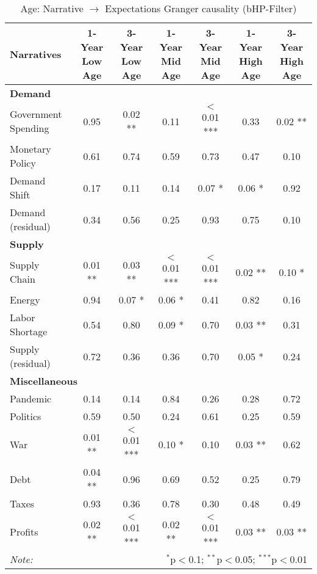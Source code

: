 \begin{sidewaystable}[H]
\centering
\footnotesize
\caption{Age: Narrative $\rightarrow$ Expectations Granger causality (bHP-Filter)}\label{table:granger}

\begin{tabular}{lcccccc}
\toprule
\textbf{Narratives} & \textbf{1-Year Low Age} & \textbf{3-Year Low Age} & \textbf{1-Year Mid Age} & \textbf{3-Year Mid Age} & \textbf{1-Year High Age} & \textbf{3-Year High Age} \\
\midrule
\multicolumn{7}{l}{\textbf{Demand}} \\
\midrule
Government Spending & 0.95 & 0.02 ** & 0.11 & $<$0.01 *** & 0.33 & 0.02 ** \\
Monetary Policy & 0.61 & 0.74 & 0.59 & 0.73 & 0.47 & 0.10 \\
Demand Shift & 0.17 & 0.11 & 0.14 & 0.07 * & 0.06 * & 0.92 \\
Demand (residual) & 0.34 & 0.56 & 0.25 & 0.93 & 0.75 & 0.10 \\
\midrule
\multicolumn{7}{l}{\textbf{Supply}} \\
\midrule
Supply Chain & 0.01 ** & 0.03 ** & $<$0.01 *** & $<$0.01 *** & 0.02 ** & 0.10 * \\
Energy & 0.94 & 0.07 * & 0.06 * & 0.41 & 0.82 & 0.16 \\
Labor Shortage & 0.54 & 0.80 & 0.09 * & 0.70 & 0.03 ** & 0.31 \\
Supply (residual) & 0.72 & 0.36 & 0.36 & 0.70 & 0.05 * & 0.24 \\
\midrule
\multicolumn{7}{l}{\textbf{Miscellaneous}} \\
\midrule
Pandemic & 0.14 & 0.14 & 0.84 & 0.26 & 0.28 & 0.72 \\
Politics & 0.59 & 0.50 & 0.24 & 0.61 & 0.25 & 0.59 \\
War & 0.01 ** & $<$0.01 *** & 0.10 * & 0.10 & 0.03 ** & 0.62 \\
Debt & 0.04 ** & 0.96 & 0.69 & 0.52 & 0.25 & 0.79 \\
Taxes & 0.93 & 0.36 & 0.78 & 0.30 & 0.48 & 0.49 \\
Profits & 0.02 ** & $<$0.01 *** & 0.02 ** & $<$0.01 *** & 0.03 ** & 0.03 ** \\
\midrule
\bottomrule
\textit{Note:}  & \multicolumn{6}{r}{$^{*}$p$<$0.1; $^{**}$p$<$0.05; $^{***}$p$<$0.01} \\
\bottomrule
\end{tabular}
\end{sidewaystable}
